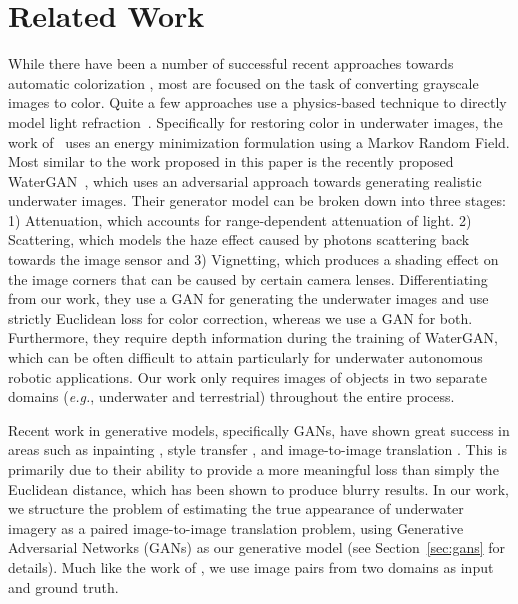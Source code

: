 \section{Related Work}
\label{sec:related}

While there have been a number of successful recent approaches towards automatic colorization 
\cite{zhang2016colorful,iizuka2016let}, most are focused on the task of converting grayscale images to color. Quite a few 
approaches use a physics-based technique to directly model light refraction~\cite{jordt2014underwater}. Specifically for
restoring color in underwater images, the work of~\cite{torres2005color} uses an energy minimization formulation using a Markov 
Random Field. Most similar to the work proposed in this paper is the recently proposed WaterGAN~\cite{li2017watergan}, 
which uses an adversarial approach towards generating realistic underwater images. Their generator model can be broken down into 
three stages: 1) Attenuation, which accounts for range-dependent attenuation of light. 2) Scattering, which models the haze 
effect caused by photons scattering back towards the image sensor and 3) Vignetting, which produces a shading effect on the 
image corners that can be caused by certain camera lenses. Differentiating from our work, they use a GAN for generating the 
underwater images and use strictly Euclidean loss for color correction, whereas we use a GAN for both. Furthermore, they require 
depth information during the training of WaterGAN, which can be often difficult to attain particularly for underwater 
autonomous robotic applications. Our work only requires images of objects in two separate domains (\emph{e.g.}, underwater 
and terrestrial) throughout the entire process.

Recent work in generative models, specifically GANs, have shown great success in areas such as inpainting 
\cite{pathak2016context}, style transfer \cite{Gatys_2016_CVPR}, and image-to-image translation 
\cite{isola2016image,zhu2017unpaired}. This is primarily due to their ability to provide a more meaningful loss than simply the 
Euclidean distance, which has been shown to produce blurry results. In our work, we structure the problem of estimating 
the true appearance of underwater imagery as a paired image-to-image translation problem, using Generative Adversarial Networks 
(GANs) as our generative model (see Section~\ref{sec:gans} for details). Much like the work of \cite{isola2016image}, we 
use image pairs from two domains as input and ground truth. 